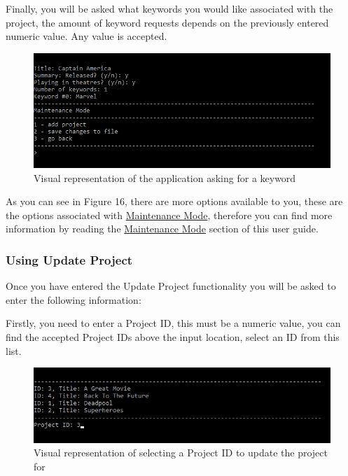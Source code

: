 \documentclass[
  english,
  a4paper,
,tablecaptionabove
]{scrartcl}
\begin{document}
Finally, you will be asked what keywords you would like associated with
the project, the amount of keyword requests depends on the previously
entered numeric value. Any value is accepted.

\begin{figure}
\centering
\includegraphics{images/user-guide/maintenance-mode/add-project-keywords.png}
\caption{Visual representation of the application asking for a keyword}
\end{figure}

As you can see in Figure 16, there are more options available to you,
these are the options associated with
\protect\hyperlink{using-maintenance-mode}{Maintenance Mode}, therefore
you can find more information by reading the
\protect\hyperlink{using-maintenance-mode}{Maintenance Mode} section of
this user guide.

\newpage

\hypertarget{using-update-project}{%
\subsubsection{Using Update Project}\label{using-update-project}}

Once you have entered the Update Project functionality you will be asked
to enter the following information:

Firstly, you need to enter a Project ID, this must be a numeric value,
you can find the accepted Project IDs above the input location, select
an ID from this list.

\begin{figure}
\centering
\includegraphics{images/user-guide/maintenance-mode/update-project-select-id.png}
\caption{Visual representation of selecting a Project ID to update the
project for}
\end{figure}
\end{document}
